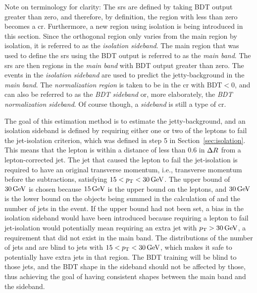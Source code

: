 Note on terminology for clarity: The \glspl{sr} are defined by taking BDT output greater than zero, and therefore, by definition, the region with less than zero becomes a \gls{cr}. Furthermore, a new region using isolation is being introduced in this section. Since the orthogonal region only varies from the main region by isolation, it is referred to as the \emph{isolation sideband}. The main region that was used to define the \glspl{sr} using the BDT output is referred to as the \emph{main band}. The \glspl{sr} are then regions in the \emph{main band} with BDT output greater than zero. The events in the \emph{isolation sideband} are used to predict the jetty-background in the \emph{main band}. The \emph{normalization region} is taken to be in the \gls{cr} with $\mathrm{BDT}<0$, and can also be referred to as the \emph{BDT sideband} or, more elaborately, the \emph{BDT normalization sideband}. Of course though, a \emph{sideband} is still a type of \gls{cr}.

The goal of this estimation method is to estimate the jetty-background, and an isolation sideband is defined by requiring either one or two of the leptons to fail the jet-isolation criterion, which was defined in step 5 in Section~\ref{sec:isolation}. This means that the lepton is within a distance of less than 0.6 in $\Delta R$ from a lepton-corrected jet. The jet that caused the lepton to fail the jet-isolation is required to have an original transverse momentum, i.e., transverse momentum before the subtractions, satisfying $15<p_{\mathrm{T}}<30\,\text{Ge\hspace{-.08em}V}$. The upper bound of $30\,\text{Ge\hspace{-.08em}V}$ is chosen because $15\,\text{Ge\hspace{-.08em}V}$ is the upper bound on the leptons, and $30\,\text{Ge\hspace{-.08em}V}$ is the lower bound on the objects being summed in the calculation of \mht and the number of jets in the event. If the upper bound had not been set, a bias in the isolation sideband would have been introduced because requiring a lepton to fail jet-isolation would potentially mean requiring an extra jet with $p_{\mathrm{T}}>30\,\text{Ge\hspace{-.08em}V}$, a requirement that did not exist in the main band. The distributions of the number of jets and \mht are blind to jets with $15<p_{\mathrm{T}}<30\,\text{Ge\hspace{-.08em}V}$, which makes it safe to potentially have extra jets in that region. The BDT training will be blind to those jets, and the BDT shape in the sideband should not be affected by those, thus achieving the goal of having consistent shapes between the main band and the sideband.

